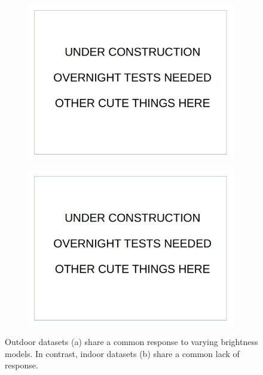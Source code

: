 \documentclass[12pt]{report}
\begin{document}
\begin{figure}
\centering
\begin{subfigure}{.8\linewidth}
  \includegraphics[width=1\linewidth]{figures/placeholder.jpg}
  \caption{}
\end{subfigure}
\hfill
\begin{subfigure}{.8\linewidth}
  \includegraphics[width=1\linewidth]{figures/placeholder.jpg}
  \caption{}
\end{subfigure}

\caption{Outdoor datasets (a) share a common response to varying brightness models. In contrast, indoor datasets (b) share a common lack of response.}
\label{fig:brightness_indoor_outdoor}
\end{figure}
\end{document}

